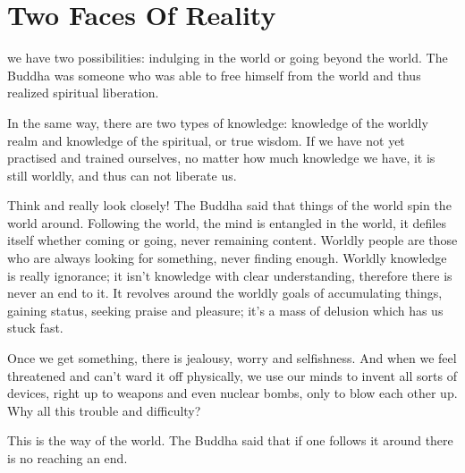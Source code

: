 
\chapter{Two Faces Of Reality}

 we have two possibilities: indulging in the world or going beyond the world. The Buddha was someone who was able to free himself from the world and thus realized spiritual liberation.

In the same way, there are two types of knowledge: knowledge of the worldly realm and knowledge of the spiritual, or true wisdom. If we have not yet practised and trained ourselves, no matter how much knowledge we have, it is still worldly, and thus can not liberate us.

Think and really look closely! The Buddha said that things of the world spin the world around. Following the world, the mind is entangled in the world, it defiles itself whether coming or going, never remaining content. Worldly people are those who are always looking for something, never finding enough. Worldly knowledge is really ignorance; it isn't knowledge with clear understanding, therefore there is never an end to it. It revolves around the worldly goals of accumulating things, gaining status, seeking praise and pleasure; it's a mass of delusion which has us stuck fast.

Once we get something, there is jealousy, worry and selfishness. And when we feel threatened and can't ward it off physically, we use our minds to invent all sorts of devices, right up to weapons and even nuclear bombs, only to blow each other up. Why all this trouble and difficulty?

This is the way of the world. The Buddha said that if one follows it around there is no reaching an end.

